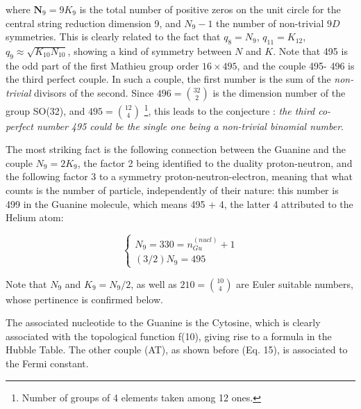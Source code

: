 \documentclass[a4paper,9pt]{article}
\begin{document}
where  $\textbf{N}_9 = 9K_9$ is the total number of positive zeros on the unit circle for the central string reduction dimension 9, and $N_{9}-1$ the number of non-trivial $9D$ symmetries. This is clearly related to the fact that $ q_8 = N_9$, $q_{11} = K_{12}$, $q_9\approx \sqrt{K_{10} N_{10}}$, showing a kind of symmetry between $N$ and $K$. Note that 495 is the odd part of the first Mathieu group order $16\times495$, and the couple 495- 496 is the third perfect couple. In such a couple, the first number is the sum of the \textit{non-trivial} divisors of the second. Since $496 = \binom{32}{2}$ is the dimension number of the group SO(32), and $495 = \binom{12}{4}$ \footnote{Number of groups of 4 elements taken among 12 ones.}, this leads to the conjecture : \textit{the third co-perfect number 495 could be the single one being a non-trivial binomial number}. 

The most striking fact is the following connection between the Guanine and the couple $N_9= 2K_9$, the factor 2 being identified to the duality proton-neutron, and the following factor 3 to a symmetry proton-neutron-electron, meaning that what counts is the number of particle, independently of their nature: this number is 499 in the Guanine molecule, which means 495 + 4, the latter 4 attributed to the Helium atom:

\begin{equation}\label{Eq26}
 \left\{
    \begin{array}{ll} 
            N_9 = 330 = n_{Gu}^{(nucl)} + 1\\
            (3/2)N_9 = 495 
    \end{array}
\right.
\end{equation}


Note that $N_9$ and $K_9 = N_9/2$, as well as $210 = \binom{10}{4}$ are Euler suitable numbers, whose pertinence is confirmed below.

The associated nucleotide to the Guanine is the Cytosine, which is clearly associated with the topological function f(10), giving rise to a formula in the Hubble Table. The other couple (AT), as shown before (Eq. 15), is associated to the Fermi constant.

 
\end{document}

